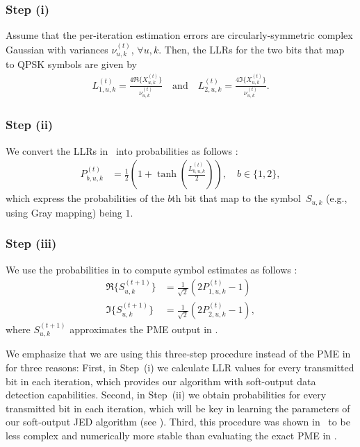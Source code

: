 \subsubsection*{Step (i)}
%
Assume that the per-iteration estimation errors are circularly-symmetric complex Gaussian with variances $\nu_{u,k}^{(t)}$, $\forall u,k$. 
%
Then, the LLRs for the two bits that map to QPSK symbols are given by \cite[Tbl. 4.3]{fateh2009vlsi} 
%
\begin{align}\label{eq:LLR1}
	L_{1,u,k}^{(t)} = \frac{4\Re \{X_{u,k}^{(t)}\}}{\nu_{u,k}^{(t)}} \quad \text{and} \quad L_{2,u,k}^{(t)} = \frac{4\Im \{X_{u,k}^{(t)}\}}{\nu_{u,k}^{(t)}}.  
\end{align}

\subsubsection*{Step (ii)}
%
We convert the LLRs in~ into probabilities as follows \cite[Eq.~3.6]{fateh2009vlsi}:
\begin{align} \label{eq:probabilities}
P_{b,u,k}^{(t)} & = \frac{1}{2}\!\left(1+\tanh\!\left(\frac{L_{b,u,k}^{(t)}}{2}\right)\!\right)\!, \quad b\in\{1,2\},
\end{align}
which express the probabilities of the $b$th bit that map to the symbol~$S_{u,k}$ (e.g., using Gray mapping) being $1$.

\subsubsection*{Step (iii)}
%
We use the probabilities in  to compute symbol estimates as follows \cite[App.~A.4]{fateh2009vlsi}:
%
\begin{align}
\Re\{S_{u,k}^{(t+1)}\} &= {\frac{1}{\sqrt{2}}}(2P_{1,u,k}^{(t)}-1) \label{eq:approximate PME 1} \\
\Im\{S_{u,k}^{(t+1)}\} &= {\frac{1}{\sqrt{2}}}(2P_{2,u,k}^{(t)}-1)\label{eq:approximate PME 2},
\end{align}
where $S_{u,k}^{(t+1)}$ approximates the PME output in .

We emphasize that we are using this three-step procedure instead of the PME in  for three reasons: 
%
First, in Step~(i) we calculate LLR values for every transmitted bit in each iteration, which provides our algorithm with soft-output data detection capabilities. 
%
Second, in Step~(ii) we obtain probabilities for every transmitted bit in each iteration, which will be key in learning the parameters of our soft-output JED algorithm (see ). 
%
Third, this procedure was shown in~\cite{jeon3542019,jeonMismatched2020} to be less complex and numerically more stable than evaluating the exact PME in .